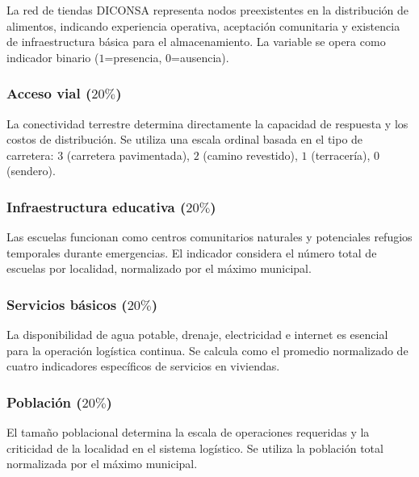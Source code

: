 \documentclass[
  spanish,
  us-letterpaper,
  DIV=11,
  numbers=noendperiod]{scrreprt}
\numberwithin{equation}{section}
\begin{document}
La red de tiendas DICONSA representa nodos preexistentes en la
distribución de alimentos, indicando experiencia operativa, aceptación
comunitaria y existencia de infraestructura básica para el
almacenamiento. La variable se opera como indicador binario
(\(1\)=presencia, \(0\)=ausencia).

\subsubsection{\texorpdfstring{Acceso vial
(\(20\%\))}{Acceso vial (20\textbackslash\%)}}\label{acceso-vial-20}

La conectividad terrestre determina directamente la capacidad de
respuesta y los costos de distribución. Se utiliza una escala ordinal
basada en el tipo de carretera: \(3\) (carretera pavimentada), \(2\)
(camino revestido), \(1\) (terracería), 0 (sendero).

\subsubsection{\texorpdfstring{Infraestructura educativa
(\(20\%\))}{Infraestructura educativa (20\textbackslash\%)}}\label{infraestructura-educativa-20}

Las escuelas funcionan como centros comunitarios naturales y potenciales
refugios temporales durante emergencias. El indicador considera el
número total de escuelas por localidad, normalizado por el máximo
municipal.

\subsubsection{\texorpdfstring{Servicios básicos
(\(20\%\))}{Servicios básicos (20\textbackslash\%)}}\label{servicios-buxe1sicos-20}

La disponibilidad de agua potable, drenaje, electricidad e internet es
esencial para la operación logística continua. Se calcula como el
promedio normalizado de cuatro indicadores específicos de servicios en
viviendas.

\subsubsection{\texorpdfstring{Población
(\(20\%\))}{Población (20\textbackslash\%)}}\label{poblaciuxf3n-20}

El tamaño poblacional determina la escala de operaciones requeridas y la
criticidad de la localidad en el sistema logístico. Se utiliza la
población total normalizada por el máximo municipal.
\end{document}
